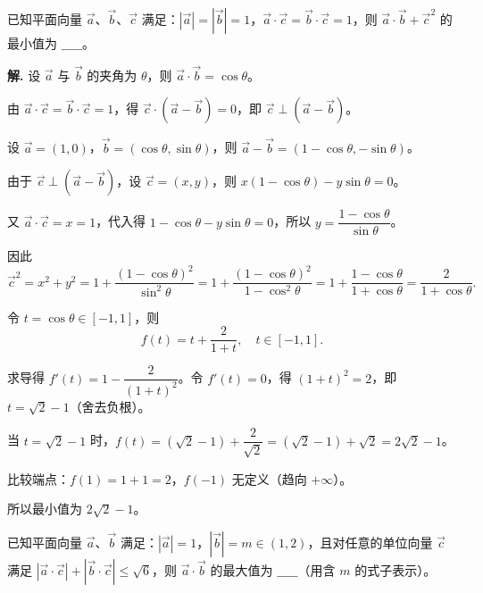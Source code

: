 \documentclass[11pt]{ctexrep}
\begin{document}
\begin{realexam}[2024 上海金山二模]
    已知平面向量 $\overrightarrow{a}$、$\overrightarrow{b}$、$\overrightarrow{c}$ 满足：$|\overrightarrow{a}| = |\overrightarrow{b}| = 1$，$\overrightarrow{a} \cdot \overrightarrow{c} = \overrightarrow{b} \cdot \overrightarrow{c} = 1$，则 $\overrightarrow{a} \cdot \overrightarrow{b} + \overrightarrow{c}^2$ 的最小值为 $\_\_\_\_\_$。
\end{realexam}

\textbf{解.} 设 $\overrightarrow{a}$ 与 $\overrightarrow{b}$ 的夹角为 $\theta$，则 $\overrightarrow{a} \cdot \overrightarrow{b} = \cos\theta$。

由 $\overrightarrow{a} \cdot \overrightarrow{c} = \overrightarrow{b} \cdot \overrightarrow{c} = 1$，得 $\overrightarrow{c} \cdot (\overrightarrow{a} - \overrightarrow{b}) = 0$，即 $\overrightarrow{c} \perp (\overrightarrow{a} - \overrightarrow{b})$。

设 $\overrightarrow{a} = (1, 0)$，$\overrightarrow{b} = (\cos\theta, \sin\theta)$，则 $\overrightarrow{a} - \overrightarrow{b} = (1-\cos\theta, -\sin\theta)$。

由于 $\overrightarrow{c} \perp (\overrightarrow{a} - \overrightarrow{b})$，设 $\overrightarrow{c} = (x, y)$，则 $x(1-\cos\theta) - y\sin\theta = 0$。

又 $\overrightarrow{a} \cdot \overrightarrow{c} = x = 1$，代入得 $1-\cos\theta - y\sin\theta = 0$，所以 $y = \dfrac{1-\cos\theta}{\sin\theta}$。

因此
\[
    \overrightarrow{c}^2 = x^2 + y^2 = 1 + \dfrac{(1-\cos\theta)^2}{\sin^2\theta} = 1 + \dfrac{(1-\cos\theta)^2}{1-\cos^2\theta} = 1 + \dfrac{1-\cos\theta}{1+\cos\theta} = \dfrac{2}{1+\cos\theta}.
\]

令 $t = \cos\theta \in [-1, 1]$，则
\[
    f(t) = t + \dfrac{2}{1+t}, \quad t \in [-1, 1].
\]

求导得 $f'(t) = 1 - \dfrac{2}{(1+t)^2}$。令 $f'(t) = 0$，得 $(1+t)^2 = 2$，即 $t = \sqrt{2}-1$（舍去负根）。

当 $t = \sqrt{2}-1$ 时，$f(t) = (\sqrt{2}-1) + \dfrac{2}{\sqrt{2}} = (\sqrt{2}-1) + \sqrt{2} = 2\sqrt{2}-1$。

比较端点：$f(1) = 1 + 1 = 2$，$f(-1)$ 无定义（趋向 $+\infty$）。

所以最小值为 $2\sqrt{2}-1$。

\begin{realexam}[2025 宝山一模]
    已知平面向量 $\overrightarrow{a}$、$\overrightarrow{b}$ 满足：$|\overrightarrow{a}| = 1$，$|\overrightarrow{b}| = m \in (1, 2)$，且对任意的单位向量 $\overrightarrow{c}$ 满足 $|\overrightarrow{a} \cdot \overrightarrow{c}| + |\overrightarrow{b} \cdot \overrightarrow{c}| \leq \sqrt{6}$，则 $\overrightarrow{a} \cdot \overrightarrow{b}$ 的最大值为 $\_\_\_\_\_$（用含 $m$ 的式子表示）。
\end{realexam}
\end{document}
